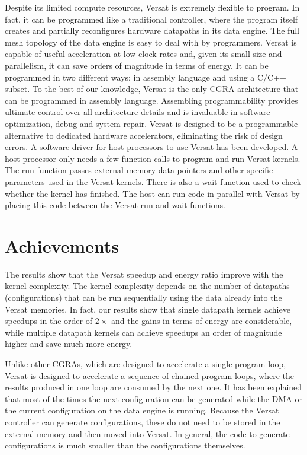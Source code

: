 Despite its limited compute resources, Versat is extremely flexible to
program. In fact, it can be programmed like a traditional controller,
where the program itself creates and partially reconfigures hardware
datapaths in its data engine. The full mesh topology of the data
engine is easy to deal with by programmers. Versat is capable of
useful acceleration at low clock rates and, given its small size and
parallelism, it can save orders of magnitude in terms of energy. It
can be programmed in two different ways: in assembly language and
using a C/C++ subset. To the best of our knowledge, Versat is the only
CGRA architecture that can be programmed in assembly
language. Assembling programmability provides ultimate control over
all architecture details and is invaluable in software optimization,
debug and system repair. Versat is designed to be a programmable
alternative to dedicated hardware accelerators, eliminating the risk
of design errors. A software driver for host processors to use Versat
has been developed. A host processor only needs a few function calls
to program and run Versat kernels. The run function passes external
memory data pointers and other specific parameters used in the Versat
kernels. There is also a wait function used to check whether the
kernel has finished. The host can run code in parallel with Versat by
placing this code between the Versat run and wait functions.


\section{Achievements}
\label{section:achievements}

The results show that the Versat speedup and energy ratio improve with
the kernel complexity. The kernel complexity depends on the number of
datapaths (configurations) that can be run sequentially using the data
already into the Versat memories. In fact, our results show that
single datapath kernels achieve speedups in the order of $2\times$ and
the gains in terms of energy are considerable, while multiple datapath
kernels can achieve speedups an order of magnitude higher and save
much more energy.

Unlike other CGRAs, which are designed to accelerate a single program
loop, Versat is designed to accelerate a sequence of chained program
loops, where the results produced in one loop are consumed by the next
one. It has been explained that most of the times the next
configuration can be generated while the DMA or the current
configuration on the data engine is running. Because the Versat
controller can generate configurations, these do not need to be stored
in the external memory and then moved into Versat. In general, the
code to generate configurations is much smaller than the
configurations themselves.

